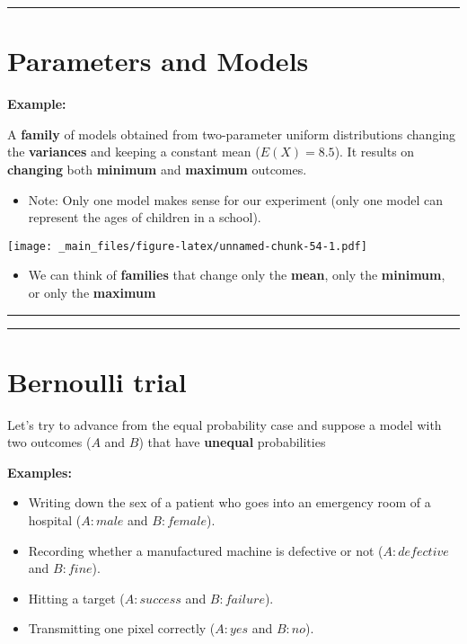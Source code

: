 \documentclass[
]{book}
\providecommand{\tightlist}{%
  \setlength{\itemsep}{0pt}\setlength{\parskip}{0pt}}
\begin{document}
\begin{center}\rule{0.5\linewidth}{0.5pt}\end{center}

\hypertarget{parameters-and-models-1}{%
\section{Parameters and Models}\label{parameters-and-models-1}}

\textbf{Example:}

A \textbf{family} of models obtained from two-parameter uniform distributions changing the \textbf{variances} and keeping a constant mean (\(E(X)=8.5\)). It results on \textbf{changing} both \textbf{minimum} and \textbf{maximum} outcomes.

\begin{itemize}
\tightlist
\item
  Note: Only one model makes sense for our experiment (only one model can represent the ages of children in a school).
\end{itemize}

\texttt{[image: \_main\_files/figure-latex/unnamed-chunk-54-1.pdf]}

\begin{itemize}
\tightlist
\item
  We can think of \textbf{families} that change only the \textbf{mean}, only the \textbf{minimum}, or only the \textbf{maximum}
\end{itemize}

\begin{center}\rule{0.5\linewidth}{0.5pt}\end{center}

\begin{center}\rule{0.5\linewidth}{0.5pt}\end{center}

\hypertarget{bernoulli-trial}{%
\section{Bernoulli trial}\label{bernoulli-trial}}

Let's try to advance from the equal probability case and suppose a model with two outcomes (\(A\) and \(B\)) that have \textbf{unequal} probabilities

\textbf{Examples:}

\begin{itemize}
\item
  Writing down the sex of a patient who goes into an emergency room of a hospital (\(A:male\) and \(B:female\)).
\item
  Recording whether a manufactured machine is defective or not (\(A:defective\) and \(B:fine\)).
\item
  Hitting a target (\(A:success\) and \(B:failure\)).
\item
  Transmitting one pixel correctly (\(A:yes\) and \(B:no\)).
\end{itemize}
\end{document}
